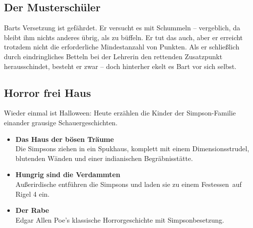 	
\subsection{Der Musterschüler}
Barts Versetzung ist gefährdet. Er versucht es mit Schummeln -- vergeblich, da bleibt ihm nichts anderes übrig, als zu büffeln. Er tut das auch, aber er erreicht trotzdem nicht die erforderliche Mindestanzahl von Punkten. Als er schließlich durch eindringliches Betteln bei der Lehrerin den rettenden Zusatzpunkt herausschindet, besteht er zwar -- doch hinterher ekelt es Bart vor sich selbst.

	
\subsection{Horror frei Haus}\label{7F04}
Wieder einmal ist Halloween: Heute erzählen die Kinder der Simpson-Familie einander grausige Schauergeschichten. 
\begin{itemize}
	\item \textbf{Das Haus der bösen Träume}\\ Die Simpsons ziehen in ein Spukhaus, komplett mit einem Dimensionsstrudel, blutenden Wänden und einer indianischen Begräbnisstätte.
	\item \textbf{Hungrig sind die Verdammten}\\ Außerirdische entführen die Simpsons und laden sie zu einem \glqq Festessen\grqq\ auf Rigel 4 ein.
	\item \textbf{Der Rabe}\\ Edgar Allen Poe's klassische Horrorgeschichte mit Simpsonbesetzung.
\end{itemize}

